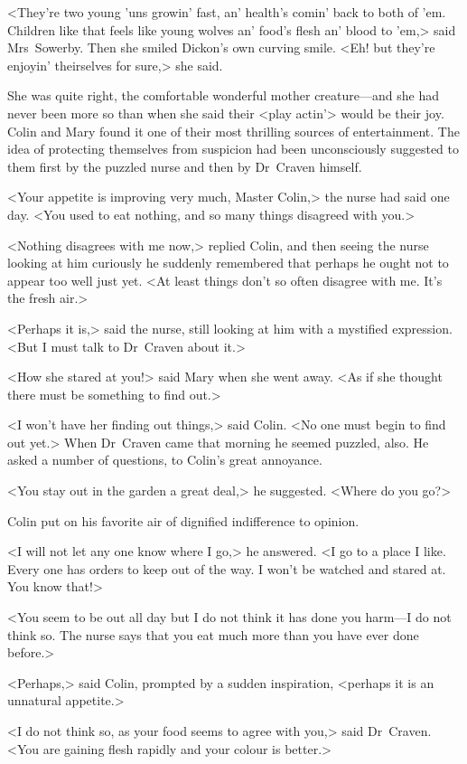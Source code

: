 <They're two young 'uns growin' fast, an' health's comin' back to both of 'em. Children like that feels like young wolves an' food's flesh an' blood to 'em,> said Mrs~Sowerby. Then she smiled Dickon's own curving smile. <Eh! but they're enjoyin' theirselves for sure,> she said.

She was quite right, the comfortable wonderful mother creature—and she had never been more so than when she said their <play actin'> would be their joy. Colin and Mary found it one of their most thrilling sources of entertainment. The idea of protecting themselves from suspicion had been unconsciously suggested to them first by the puzzled nurse and then by Dr~Craven himself.

<Your appetite is improving very much, Master Colin,> the nurse had said one day. <You used to eat nothing, and so many things disagreed with you.>

<Nothing disagrees with me now,> replied Colin, and then seeing the nurse looking at him curiously he suddenly remembered that perhaps he ought not to appear too well just yet. <At least things don't so often disagree with me. It's the fresh air.>

<Perhaps it is,> said the nurse, still looking at him with a mystified expression. <But I must talk to Dr~Craven about it.>

<How she stared at you!> said Mary when she went away. <As if she thought there must be something to find out.>

<I won't have her finding out things,> said Colin. <No one must begin to find out yet.> When Dr~Craven came that morning he seemed puzzled, also. He asked a number of questions, to Colin's great annoyance.

<You stay out in the garden a great deal,> he suggested. <Where do you go?>

Colin put on his favorite air of dignified indifference to opinion.

<I will not let any one know where I go,> he answered. <I go to a place I like. Every one has orders to keep out of the way. I won't be watched and stared at. You know that!>

<You seem to be out all day but I do not think it has done you harm—I do not think so. The nurse says that you eat much more than you have ever done before.>

<Perhaps,> said Colin, prompted by a sudden inspiration, <perhaps it is an unnatural appetite.>

<I do not think so, as your food seems to agree with you,> said Dr~Craven. <You are gaining flesh rapidly and your colour is better.>

